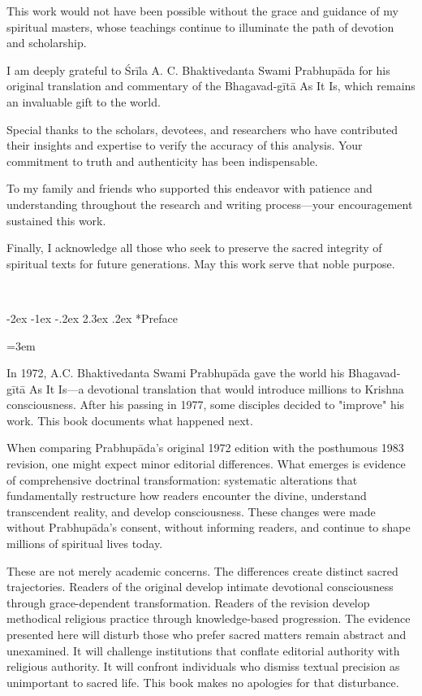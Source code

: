 \documentclass[12pt,twoside]{book}
\makeatletter
\newcommand{\forcenumbering}{\let\ps@plain\ps@fancy\let\ps@headings\ps@fancy}
\newcommand{\startmainmatter}{\clearpage\pagenumbering{arabic}\setcounter{page}{1}\pagestyle{fancy}\forcenumbering}
\renewcommand\section{\@startsection{section}{1}{\z@}%
{-2ex \@plus -1ex \@minus -.2ex}%
{2.3ex \@plus.2ex}%
{\normalfont\Large\bfseries}}
\makeatother
\begin{document}
This work would not have been possible without the grace and guidance of my spiritual masters, whose teachings continue to illuminate the path of devotion and scholarship.

I am deeply grateful to Śrīla A. C. Bhaktivedanta Swami Prabhupāda for his original translation and commentary of the Bhagavad-gītā As It Is, which remains an invaluable gift to the world.

Special thanks to the scholars, devotees, and researchers who have contributed their insights and expertise to verify the accuracy of this analysis. Your commitment to truth and authenticity has been indispensable.

To my family and friends who supported this endeavor with patience and understanding throughout the research and writing process—your encouragement sustained this work.

Finally, I acknowledge all those who seek to preserve the sacred integrity of spiritual texts for future generations. May this work serve that noble purpose.

\clearpage

\thispagestyle{frontmatter}
~
\clearpage

\startmainmatter
\pagestyle{fancy}

\section*{Preface}
\thispagestyle{sectionopening}
\setlength{\parskip}{3pt plus 1pt minus 1pt}
\emergencystretch=3em

In 1972, A.C. Bhaktivedanta Swami Prabhupāda gave the world his Bhagavad-gītā As It Is—a devotional translation that would introduce millions to Krishna consciousness. After his passing in 1977, some disciples decided to "improve" his work. This book documents what happened next.

When comparing Prabhupāda's original 1972 edition with the posthumous 1983 revision, one might expect minor editorial differences. What emerges is evidence of comprehensive doctrinal transformation: systematic alterations that fundamentally restructure how readers encounter the divine, understand transcendent reality, and develop consciousness. These changes were made without Prabhupāda's consent, without informing readers, and continue to shape millions of spiritual lives today.

These are not merely academic concerns. The differences create distinct sacred trajectories. Readers of the original develop intimate devotional consciousness through grace-dependent transformation. Readers of the revision develop methodical religious practice through knowledge-based progression. The evidence presented here will disturb those who prefer sacred matters remain abstract and unexamined. It will challenge institutions that conflate editorial authority with religious authority. It will confront individuals who dismiss textual precision as unimportant to sacred life. This book makes no apologies for that disturbance.
\end{document}

